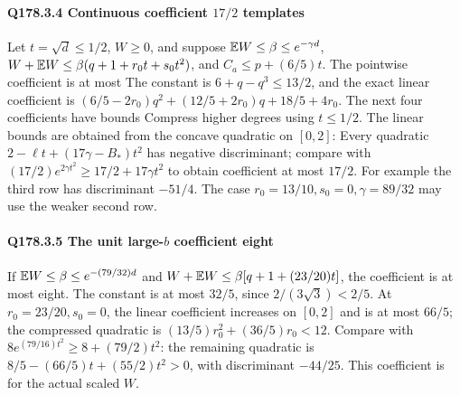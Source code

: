 \paragraph{Q178.3.4 Continuous coefficient $17/2$ templates}\label{part:Q178.3.4}
Let $t=\allowbreak \sqrt d\le\allowbreak 1/2$, $W\ge\allowbreak 0$, and suppose
$\mathbb E W\le\allowbreak \beta\le\allowbreak  e^{-\gamma d}$,
$W+\mathbb E W\le\allowbreak \beta(q+1+r_0t+s_0t^2)$, and $C_a\le\allowbreak  p+(6/5)t$.
The pointwise coefficient is at most
The constant is $6+q-q^3\le\allowbreak 13/2$, and the exact linear coefficient is
$(6/5-2r_0)q^2+(12/5+2r_0)q+18/5+4r_0$.
The next four coefficients have bounds
Compress higher degrees using $t\le\allowbreak 1/2$.
The linear bounds are obtained from the concave quadratic on $[0,\allowbreak 2]$:
Every quadratic $2-\ell t+(17\gamma-B_*)t^2$ has negative discriminant;
compare with $(17/2)e^{2\gamma t^2}\ge\allowbreak 17/2+17\gamma t^2$ to obtain
coefficient at most $17/2$.
For example the third row has discriminant $-51/4$.
The case $r_0=\allowbreak 13/10,\allowbreak s_0=\allowbreak 0,\allowbreak \gamma=\allowbreak 89/32$ may use the weaker second row.

\paragraph{Q178.3.5 The unit large-$b$ coefficient eight}\label{part:Q178.3.5}
If $\mathbb E W\le\allowbreak \beta\le\allowbreak  e^{-(79/32)d}$ and
$W+\mathbb E W\le\allowbreak \beta[q+1+(23/20)t]$, the coefficient is at most eight.
The constant is at most $32/5$, since $2/(3\sqrt3)<\allowbreak 2/5$.
At $r_0=\allowbreak 23/20,\allowbreak s_0=\allowbreak 0$, the linear coefficient increases on $[0,\allowbreak 2]$
and is at most $66/5$; the compressed quadratic is
$(13/5)r_0^2+(36/5)r_0<\allowbreak 12$.
Compare with $8e^{(79/16)t^2}\ge\allowbreak 8+(79/2)t^2$:
the remaining quadratic is $8/5-(66/5)t+(55/2)t^2>\allowbreak 0$, with
discriminant $-44/25$. This coefficient is for the actual scaled $W$.

